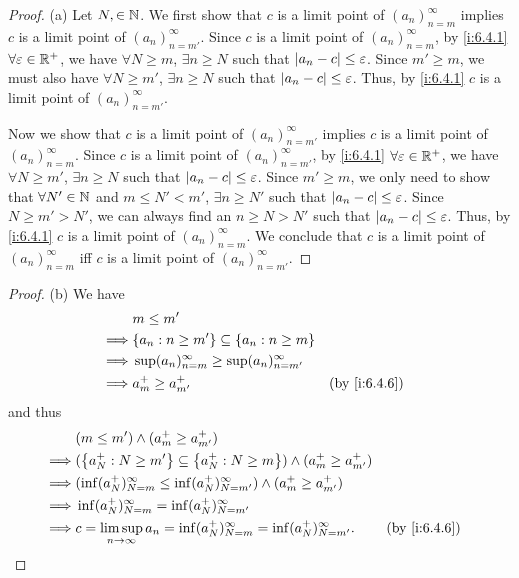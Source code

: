 \begin{proof}{(a)}
  Let \(N, \in \mathbb{N}\).
  We first show that \(c\) is a limit point of \((a_n)_{n = m}^\infty\) implies \(c\) is a limit point of \((a_n)_{n = m'}^\infty\).
  Since \(c\) is a limit point of \((a_n)_{n = m}^\infty\), by \cref{i:6.4.1} \(\forall \varepsilon \in \mathbb{R}^+\), we have \(\forall N \geq m\), \(\exists n \geq N\) such that \(\left\lvert a_n - c\right\rvert \leq \varepsilon\).
  Since \(m' \geq m\), we must also have \(\forall N \geq m'\), \(\exists n \geq N\) such that \(\left\lvert a_n - c\right\rvert \leq \varepsilon\).
  Thus, by \cref{i:6.4.1} \(c\) is a limit point of \((a_n)_{n = m'}^\infty\).

  Now we show that \(c\) is a limit point of \((a_n)_{n = m'}^\infty\) implies \(c\) is a limit point of \((a_n)_{n = m}^\infty\).
  Since \(c\) is a limit point of \((a_n)_{n = m'}^\infty\), by \cref{i:6.4.1} \(\forall \varepsilon \in \mathbb{R}^+\), we have \(\forall N \geq m'\), \(\exists n \geq N\) such that \(\left\lvert a_n - c\right\rvert \leq \varepsilon\).
  Since \(m' \geq m\), we only need to show that \(\forall N' \in \mathbb{N}\) and \(m \leq N' < m'\), \(\exists n \geq N'\) such that \(\left\lvert a_n - c\right\rvert \leq \varepsilon\).
  Since \(N \geq m' > N'\), we can always find an \(n \geq N > N'\) such that \(\left\lvert a_n - c\right\rvert \leq \varepsilon\).
  Thus, by \cref{i:6.4.1} \(c\) is a limit point of \((a_n)_{n = m}^\infty\).
  We conclude that \(c\) is a limit point of \((a_n)_{n = m}^\infty\) iff \(c\) is a limit point of \((a_n)_{n = m'}^\infty\).
\end{proof}

\begin{proof}{(b)}
  We have
  \begin{align*}
             & m \leq m'                                                                 \\
    \implies & \set{a_n : n \geq m'} \subseteq \set{a_n : n \geq m}                      \\
    \implies & \sup(a_n)_{n = m}^\infty \geq \sup(a_n)_{n = m'}^\infty                   \\
    \implies & a_m^+ \geq a_{m'}^+                                     &  & \by{i:6.4.6}
  \end{align*}
  and thus
  \begin{align*}
             & (m \leq m') \land (a_m^+ \geq a_{m'}^+)                                                                      \\
    \implies & (\set{a_N^+ : N \geq m'} \subseteq \set{a_N^+ : N \geq m}) \land (a_m^+ \geq a_{m'}^+)                       \\
    \implies & (\inf(a_N^+)_{N = m}^\infty \leq \inf(a_N^+)_{N = m'}^\infty) \land (a_m^+ \geq a_{m'}^+)                    \\
    \implies & \inf(a_N^+)_{N = m}^\infty = \inf(a_N^+)_{N = m'}^\infty                                                     \\
    \implies & c = \limsup_{n \to \infty} a_n = \inf(a_N^+)_{N = m}^\infty = \inf(a_N^+)_{N = m'}^\infty. &  & \by{i:6.4.6}
  \end{align*}
\end{proof}

